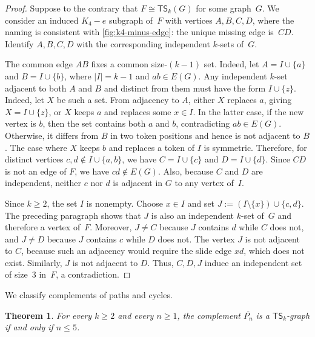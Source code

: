 \documentclass[a4paper]{article}
\theoremstyle{plain}
\newtheorem{theorem}{Theorem}[section]
\theoremstyle{definition}
\newcommand{\TSsym}{\mathsf{TS}}
\numberwithin{equation}{section}
\begin{document}
\begin{proof}
Suppose to the contrary that $F\cong\TSsym_k(G)$ for some graph~$G$.
We consider an induced $K_4-e$ subgraph of~$F$ with vertices $A,B,C,D$, where the naming is consistent with \cref{fig:k4-minus-edge}: the unique missing edge is~$CD$.
Identify $A,B,C,D$ with the corresponding independent $k$-sets of~$G$.

The common edge $AB$ fixes a common size-$(k-1)$ set.
Indeed, let $A=I\cup\{a\}$ and $B=I\cup\{b\}$, where $|I|=k-1$ and $ab\in E(G)$.
Any independent $k$-set adjacent to both $A$ and $B$ and distinct from them must have the form $I\cup\{z\}$.
Indeed, let $X$ be such a set.
From adjacency to $A$, either $X$ replaces $a$, giving $X=I\cup\{z\}$, or $X$ keeps $a$ and replaces some $x\in I$.
In the latter case, if the new vertex is $b$, then the set contains both $a$ and $b$, contradicting $ab\in E(G)$.
Otherwise, it differs from $B$ in two token positions and hence is not adjacent to $B$.
The case where $X$ keeps $b$ and replaces a token of $I$ is symmetric.
Therefore, for distinct vertices $c,d\notin I\cup\{a,b\}$, we have $C=I\cup\{c\}$ and $D=I\cup\{d\}$.
Since $CD$ is not an edge of $F$, we have $cd\notin E(G)$.
Also, because $C$ and $D$ are independent, neither $c$ nor $d$ is adjacent in $G$ to any vertex of~$I$.

Since $k\ge 2$, the set $I$ is nonempty.
Choose $x\in I$ and set $J:=(I\setminus\{x\})\cup\{c,d\}$.
The preceding paragraph shows that $J$ is also an independent $k$-set of~$G$ and therefore a vertex of~$F$.
Moreover, $J\ne C$ because $J$ contains $d$ while $C$ does not, and $J\ne D$ because $J$ contains $c$ while $D$ does not.
The vertex $J$ is not adjacent to $C$, because such an adjacency would require the slide edge $xd$, which does not exist.
Similarly, $J$ is not adjacent to $D$.
Thus, $C,D,J$ induce an independent set of size~$3$ in~$F$, a contradiction.
\end{proof}

We classify complements of paths and cycles.

\begin{theorem}
\label{thm:complement-paths}
For every $k\ge 2$ and every $n\ge 1$, the complement $\overline{P_n}$ is a $\TSsym_k$-graph if and only if $n\le 5$.
\end{theorem}
\end{document}
